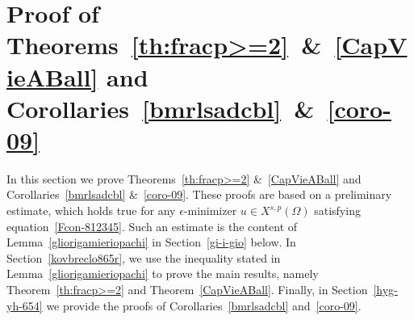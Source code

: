 \documentclass[12pt]{article}
\numberwithin{equation}{section}
\begin{document}
\section{Proof of Theorems~\ref{th:fracp>=2}~\&~\ref{CapVieABall} and Corollaries~\ref{bmrlsadcbl}~\&~\ref{coro-09}}\label{7hltgb5454546}

In this section we prove Theorems~\ref{th:fracp>=2} \&~\ref{CapVieABall} and Corollaries~\ref{bmrlsadcbl} \&~\ref{coro-09}. These proofs are based on a preliminary estimate, which holds true for any $\epsilon$-minimizer $u\in X^{s,p}(\Omega)$  satisfying equation~\eqref{Fcon-812345}. Such an estimate is the content of Lemma~\ref{gliorigamieriopachi} in Section~\ref{gi-i-gio} below. In Section~\ref{kovbreclo865r}, we use the inequality stated in Lemma~\ref{gliorigamieriopachi} to prove the main results, namely Theorem~\ref{th:fracp>=2} and Theorem~\ref{CapVieABall}. Finally, in Section~\ref{hyg-yh-654} we provide the proofs of Corollaries~\ref{bmrlsadcbl} and~\ref{coro-09}.      
\end{document}
